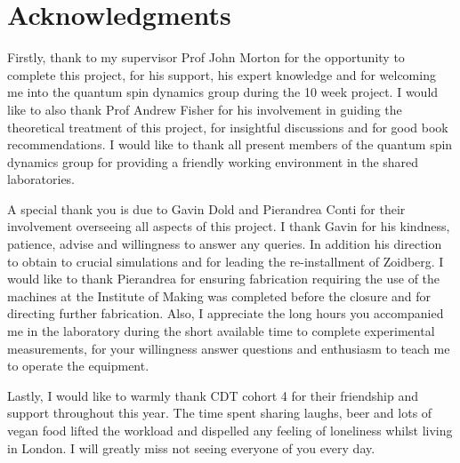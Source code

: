 \chapter{Acknowledgments} Firstly, thank to my supervisor Prof John Morton for the opportunity to complete this project, for his support, his expert knowledge and for welcoming me into the quantum spin dynamics group during the 10 week project. I would like to also thank Prof Andrew Fisher for his involvement in guiding the theoretical treatment of this project, for insightful discussions and for good book recommendations. I would like to thank all present members of the quantum spin dynamics group for providing a friendly working environment in the shared laboratories.  

A special thank you is due to Gavin Dold and Pierandrea Conti for their involvement overseeing all aspects of this project. I thank Gavin for his kindness, patience, advise and willingness to answer any queries. In addition his direction to obtain to crucial simulations and for leading the re-installment of Zoidberg. I would like to thank Pierandrea for ensuring fabrication requiring the use of the machines at the Institute of Making was completed before the closure and for directing further fabrication. Also, I appreciate the long hours you accompanied me in the laboratory during the short available time to complete experimental measurements, for your willingness answer questions and enthusiasm to teach me to operate the equipment. 

Lastly, I would like to warmly thank CDT cohort 4 for their friendship and support throughout this year. The time spent sharing laughs, beer and lots of vegan food lifted the workload and dispelled any feeling of loneliness whilst living in London. I will greatly miss not seeing everyone of you every day. 


